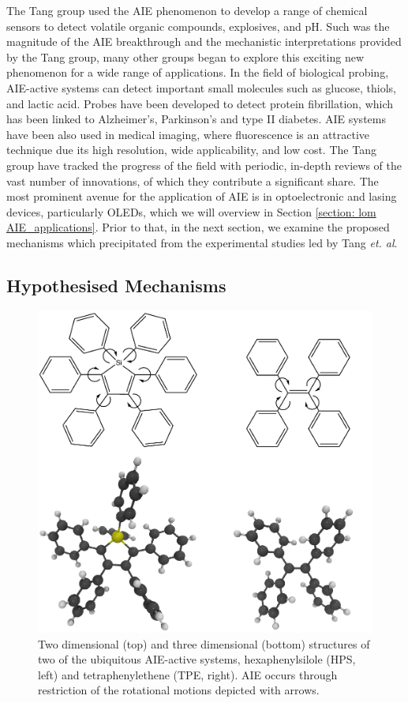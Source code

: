The Tang group used the \ac{AIE} phenomenon to develop a range of chemical sensors to detect volatile organic compounds, explosives, and pH.\cite{Dong2007,Li2005,Li2009} Such was the magnitude of the \ac{AIE} breakthrough and the mechanistic interpretations provided by the Tang group, many other groups began to explore this exciting new phenomenon for a wide range of applications. In the field of biological probing, \ac{AIE}-active systems can detect important small molecules such as glucose, thiols, and lactic acid.\cite{Wang2014,Yuan2014,Shen2012} Probes have been developed to detect protein fibrillation, which has been linked to Alzheimer's, Parkinson's and type II diabetes.\cite{Hong2012} \ac{AIE} systems have been also used in medical imaging, where fluorescence is an attractive technique due its high resolution, wide applicability, and low cost.\cite{Mei2015} The Tang group have tracked the progress of the field with periodic, in-depth reviews of the vast number of innovations, of which they contribute a significant share.\cite{Hong2009,Wang2010a,Hong2011,Mei2014,Hu2014,Mei2015} The most prominent avenue for the application of AIE is in optoelectronic and lasing devices, particularly OLEDs, which we will overview in Section \ref{section: lom AIE_applications}. Prior to that, in the next section,  we examine the proposed mechanisms which precipitated from the experimental studies led by Tang \textit{et. al}.

\subsection{Hypothesised Mechanisms}\label{section: lom AIE_mechanisms}

\begin{figure}[t]
\centering
  \includegraphics[width=0.7\linewidth]{1Intro/HPS_TPE.pdf}
  \caption[Examples of AIE-active chromophores]{Two dimensional (top) and three dimensional (bottom) structures of two of the ubiquitous AIE-active systems, hexaphenylsilole (HPS, left) and tetraphenylethene (\ac{TPE}, right). AIE occurs through restriction of the rotational motions depicted with arrows.}
  \label{figure: HPS_TPE}
\end{figure}

